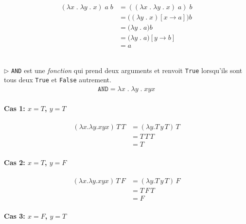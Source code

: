 \documentclass{report}
\begin{document}
\begin{multicols*}{3}
  \begin{EExample}{}{}
    \begin{align*}
      (\lambda x \; . \; \lambda y \; . \; x) \; a \; b
      &= 
      ((\lambda x \; . \; \lambda y \; . \; x) \; a) \; b
      \\
      &= 
      \bigl((\lambda y \; . \; x)[x \rightarrow a]\bigr) b 
      \\ 
      &= \bigl( \lambda y \; . \; a \bigr) b
      \\
      &= \bigl( \lambda y \; . \; a \bigr)[y \rightarrow b]
      \\ 
      &= a
    \end{align*} 
  \end{EExample}
  \mbox{}\\
  
  \noindent
  $\rhd$ \texttt{AND} est une \textit{fonction} qui prend deux arguments 
  et renvoit \texttt{True} lorsqu'ils sont tous deux \texttt{True} et 
  \texttt{False} autrement. 
  \begin{align*}
      \texttt{AND} = \lambda x \; . \; \lambda y \; . \; x y x  
  \end{align*}

  
    \paragraph{Cas 1: \(x = T\), \(y = T\)}

    \begin{align*}
    (\lambda x . \lambda y . x y x) \, T \, T &= (\lambda y . T \, y \, T) \, T \\
                                              &= T \, T \, T \\
                                              &= T
    \end{align*}

  \paragraph{Cas 2: \(x = T\), \(y = F\)}

  \begin{align*}
  (\lambda x . \lambda y . x y x) \, T \, F &= (\lambda y . T \, y \, T) \, F \\
                                            &= T \, F \, T \\
                                            &= F
  \end{align*}

  \paragraph{Cas 3: \(x = F\), \(y = T\)}


\end{multicols*}
\end{document}
